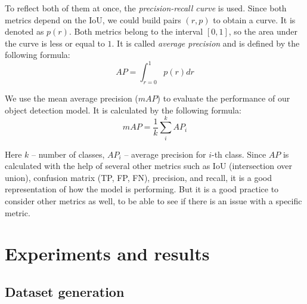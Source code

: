 \documentclass[14pt,a4paper]{extarticle}
\newcounter{e}
\numberwithin{equation}{section}
\numberwithin{figure}{section}
\begin{document}
To reflect both of them at once, the \textit{precision-recall curve} is used. Since both metrics depend on the IoU, we could build pairs $(r, p)$ to obtain a curve. It is denoted as $p(r)$. Both metrics belong to the interval $[0, 1]$, so the area under the curve is less or equal to $1$. It is called \textit{average precision} and is defined by the following formula:
\begin{equation}
    AP=\int_{r=0}^1 p(r) d r
\end{equation}


We use the mean average precision ($mAP$) to evaluate the performance of our object detection model. It is calculated by the following formula:
\begin{equation}
    m A P=\frac{1}{k} \sum_i^k A P_i 
\end{equation}

Here $k$ – number of classes, $AP_i$ – average precision for $i$-th class. Since $AP$ is calculated with the help of several other metrics such as IoU (intersection over union), confusion matrix (TP, FP, FN), precision, and recall, it is a good representation of how the model is performing. But it is a good practice to consider other metrics as well, to be able to see if there is an issue with a specific metric.

\newpage
\thispagestyle{empty}

\newpage
\thispagestyle{empty}
\section{Experiments and results}
\subsection{Dataset generation}

\end{document}
